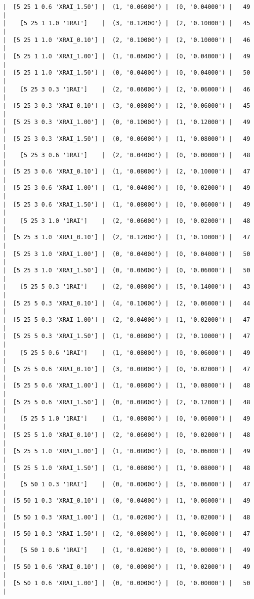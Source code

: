 \documentclass{article}
\begin{document}
\begin{verbatim}
|  [5 25 1 0.6 'XRAI_1.50'] |  (1, '0.06000') |  (0, '0.04000') |   49  |
|    [5 25 1 1.0 '1RAI']    |  (3, '0.12000') |  (2, '0.10000') |   45  |
|  [5 25 1 1.0 'XRAI_0.10'] |  (2, '0.10000') |  (2, '0.10000') |   46  |
|  [5 25 1 1.0 'XRAI_1.00'] |  (1, '0.06000') |  (0, '0.04000') |   49  |
|  [5 25 1 1.0 'XRAI_1.50'] |  (0, '0.04000') |  (0, '0.04000') |   50  |
|    [5 25 3 0.3 '1RAI']    |  (2, '0.06000') |  (2, '0.06000') |   46  |
|  [5 25 3 0.3 'XRAI_0.10'] |  (3, '0.08000') |  (2, '0.06000') |   45  |
|  [5 25 3 0.3 'XRAI_1.00'] |  (0, '0.10000') |  (1, '0.12000') |   49  |
|  [5 25 3 0.3 'XRAI_1.50'] |  (0, '0.06000') |  (1, '0.08000') |   49  |
|    [5 25 3 0.6 '1RAI']    |  (2, '0.04000') |  (0, '0.00000') |   48  |
|  [5 25 3 0.6 'XRAI_0.10'] |  (1, '0.08000') |  (2, '0.10000') |   47  |
|  [5 25 3 0.6 'XRAI_1.00'] |  (1, '0.04000') |  (0, '0.02000') |   49  |
|  [5 25 3 0.6 'XRAI_1.50'] |  (1, '0.08000') |  (0, '0.06000') |   49  |
|    [5 25 3 1.0 '1RAI']    |  (2, '0.06000') |  (0, '0.02000') |   48  |
|  [5 25 3 1.0 'XRAI_0.10'] |  (2, '0.12000') |  (1, '0.10000') |   47  |
|  [5 25 3 1.0 'XRAI_1.00'] |  (0, '0.04000') |  (0, '0.04000') |   50  |
|  [5 25 3 1.0 'XRAI_1.50'] |  (0, '0.06000') |  (0, '0.06000') |   50  |
|    [5 25 5 0.3 '1RAI']    |  (2, '0.08000') |  (5, '0.14000') |   43  |
|  [5 25 5 0.3 'XRAI_0.10'] |  (4, '0.10000') |  (2, '0.06000') |   44  |
|  [5 25 5 0.3 'XRAI_1.00'] |  (2, '0.04000') |  (1, '0.02000') |   47  |
|  [5 25 5 0.3 'XRAI_1.50'] |  (1, '0.08000') |  (2, '0.10000') |   47  |
|    [5 25 5 0.6 '1RAI']    |  (1, '0.08000') |  (0, '0.06000') |   49  |
|  [5 25 5 0.6 'XRAI_0.10'] |  (3, '0.08000') |  (0, '0.02000') |   47  |
|  [5 25 5 0.6 'XRAI_1.00'] |  (1, '0.08000') |  (1, '0.08000') |   48  |
|  [5 25 5 0.6 'XRAI_1.50'] |  (0, '0.08000') |  (2, '0.12000') |   48  |
|    [5 25 5 1.0 '1RAI']    |  (1, '0.08000') |  (0, '0.06000') |   49  |
|  [5 25 5 1.0 'XRAI_0.10'] |  (2, '0.06000') |  (0, '0.02000') |   48  |
|  [5 25 5 1.0 'XRAI_1.00'] |  (1, '0.08000') |  (0, '0.06000') |   49  |
|  [5 25 5 1.0 'XRAI_1.50'] |  (1, '0.08000') |  (1, '0.08000') |   48  |
|    [5 50 1 0.3 '1RAI']    |  (0, '0.00000') |  (3, '0.06000') |   47  |
|  [5 50 1 0.3 'XRAI_0.10'] |  (0, '0.04000') |  (1, '0.06000') |   49  |
|  [5 50 1 0.3 'XRAI_1.00'] |  (1, '0.02000') |  (1, '0.02000') |   48  |
|  [5 50 1 0.3 'XRAI_1.50'] |  (2, '0.08000') |  (1, '0.06000') |   47  |
|    [5 50 1 0.6 '1RAI']    |  (1, '0.02000') |  (0, '0.00000') |   49  |
|  [5 50 1 0.6 'XRAI_0.10'] |  (0, '0.00000') |  (1, '0.02000') |   49  |
|  [5 50 1 0.6 'XRAI_1.00'] |  (0, '0.00000') |  (0, '0.00000') |   50  |

\end{verbatim}
\end{document}
